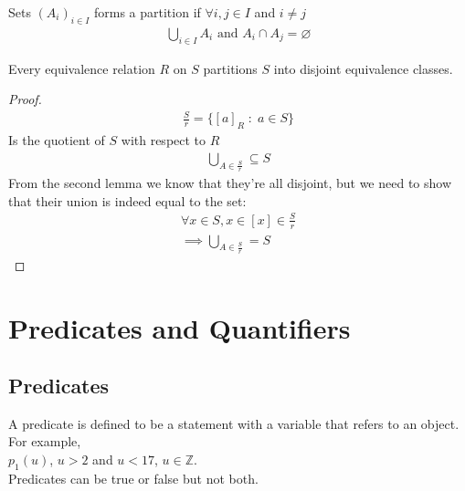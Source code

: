 \documentclass[a4paper]{article}
\theoremstyle{plain}
\newtheorem{thm}{Theorem}[section]
\theoremstyle{definition}
\newtheorem{defn}{Definition}[section]
\theoremstyle{remark}
\begin{document}
\begin{tcolorbox}[colback=black!3!white,colframe=black!60!white,title=\begin{defn}Partitioning \label{Partitioning}\end{defn}]
Sets $\left( A_i \right) _{i \in I}$ forms a partition if $\forall i,j \in I$ and $i \neq j$
\begin{align}
	\bigcup_{i\in I}A_i \text{ and } A_i \cap A_j = \varnothing
\end{align}
\end{tcolorbox}
\begin{tcolorbox}[colback=black!3!white,colframe=black!60!white,title=\begin{thm}Partitions of a set and disjoints \label{Partitions of a set and disjoints}\end{thm}]
Every equivalence relation $R$ on $S$ partitions $S$ into disjoint equivalence classes.
\begin{proof}

	\begin{align}
		\frac{S}{r} = \{[a]_R \; : \; a \in S \}	
	\end{align}
	Is the quotient of $S$ with respect to $R$
	\begin{align}
		\bigcup_{A \in \frac{S}{r}} \subseteq S
	\end{align}
	From the second lemma we know that they're all disjoint, but we need to show that their union is indeed equal to the set:
	\begin{align}
		\forall x \in S, x \in [x] \in \frac{S}{r}\\
		\implies \bigcup_{A \in \frac{S}{r}} = S
	\end{align}
\end{proof}
\end{tcolorbox}
\section{Predicates and Quantifiers}
\subsection{Predicates}
A predicate is defined to be a statement with a variable that refers to an object. For example,\\
$p_1(u)$, $u>2$ and $u<17$, $u \in \mathbb{Z}$.\\
Predicates can be true or false but not both.
\end{document}
